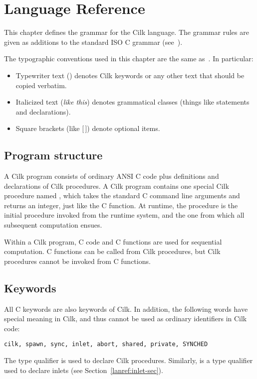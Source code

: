 \chapter{Language Reference}
\label{chap:lanref}

This chapter defines the grammar for the Cilk language.  The grammar
rules are given as additions to the standard ISO C grammar
(see~\cite[Appendix B]{HarbisonSt95}).

The typographic conventions used in this chapter are the same
as~\cite{HarbisonSt95}. In particular:
\begin{itemize}
\item Typewriter text () denotes Cilk keywords
  or any other text that should be copied verbatim.
\item Italicized text (\textit{like this}) denotes grammatical
  classes (things like statements and declarations).
\item Square brackets (like {\rm [\,]}) denote optional items.
\end{itemize}

\section{Program structure}

A Cilk program consists of ordinary ANSI C code plus definitions and
declarations of Cilk procedures.  A Cilk program contains one special
Cilk procedure named , which takes the standard C command
line arguments and returns an integer, just like the C 
function.  At runtime, the  procedure is the initial
procedure invoked from the runtime system, and the one from which all
subsequent computation ensues.

Within a Cilk program, C code and C functions are used for sequential
computation.  C functions can be called from Cilk procedures, but Cilk
procedures cannot be invoked from C
functions.

\section{Keywords}

All C keywords are also keywords of Cilk.  In addition, the following
words have special meaning in Cilk, and thus cannot be used as
ordinary identifiers in Cilk code:
\begin{syntax}
\tt cilk, spawn, sync, inlet, abort, shared, private, SYNCHED \\
\end{syntax}
The type qualifier  is used to declare Cilk procedures.
Similarly,  is a type qualifier used to declare inlets (see
Section~\ref{lanref:inlet-sec}).

